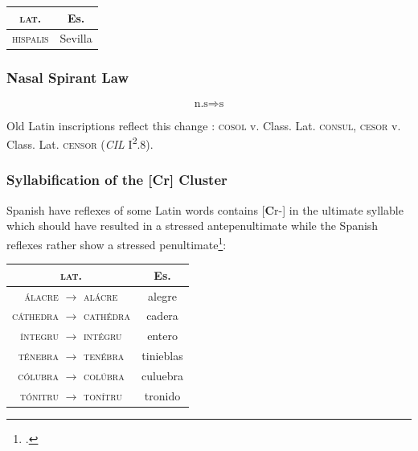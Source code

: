 \documentclass{report}[12pt]
\begin{document}
\begin{center}
  \begin{tabular}{c c}
    \textsc{lat.} & Es. \\
    \hline
    \textsc{hispalis} & Sevilla
  \end{tabular}
\end{center}

\subsubsection{Nasal Spirant Law}

\begin{tcolorbox}
  \[ \text{n.s} \Rightarrow \text{s} \]
\end{tcolorbox}

Old Latin inscriptions reflect this change \parencite[p.~17]{companion_to_latin}: \textsc{cosol} v. Class. Lat. \textsc{consul}, \textsc{cesor} v. Class. Lat. \textsc{censor} (\emph{CIL} I\textsuperscript{2}.8).

\subsubsection{Syllabification of the [Cr] Cluster}

Spanish have reflexes of some Latin words contains [\textbf{C}r-] in the ultimate syllable which should have resulted in a stressed antepenultimate while the Spanish reflexes rather show a stressed penultimate\footcite[p.~115]{lloyd_spanish}:
\begin{center}
  \begin{tabular}{c c}
    \textsc{lat.} & Es. \\
    \hline
    \textsc{\'{a}lacre} $\rightarrow$ \textsc{al\'{a}cre} & alegre \\
    \textsc{c\'{a}thedra} $\rightarrow$ \textsc{cath\'{e}dra} & cadera \\
    \textsc{\'{i}ntegru} $\rightarrow$ \textsc{int\'{e}gru} & entero \\
    \textsc{t\'{e}nebra} $\rightarrow$ \textsc{ten\'{e}bra} & tinieblas \\
    \textsc{c\'{o}lubra} $\rightarrow$ \textsc{col\'{u}bra} & culuebra \\
    \textsc{t\'{o}nitru} $\rightarrow$ \textsc{ton\'{i}tru} & tronido \\
  \end{tabular}
\end{center}

\pagebreak
\end{document}
